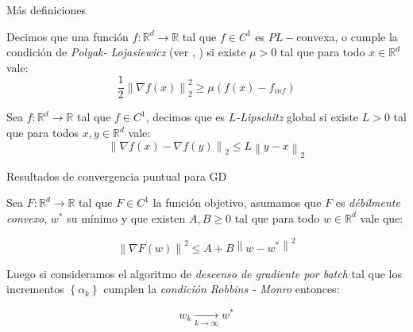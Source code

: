 \documentclass{beamer}
\newcommand{\R}{{\mathbb{R}}}
\newcommand{\norm}[1]{\left\lVert#1\right\rVert}
\newcommand{\sett}[1]{\left\lbrace#1\right\rbrace}
\newcommand{\underlimitinf}[1]{\xrightarrow[#1 \rightarrow \infty]{}}
\begin{document}
\begin{frame}{M\'as definiciones}

\begin{definition}
	Decimos que una funci\'on $f:\R^d \rightarrow \R$ tal que $f \in C^1$ es $PL-$convexa, o cumple la condici\'on de \textit{Polyak- Lojasiewicz} (ver \cite{polyak:1963}, \cite{lojasiewicz:1963}) si existe $\mu >0$ tal que para todo $x \in \R^d$ vale:
	\begin{equation*}
	\frac{1}{2} \norm{\nabla f(x)}^2_2 \geq \mu \left(f(x) - f_{inf}\right)
	\end{equation*}
\end{definition}

\begin{definition}
	Sea $f:\R^d \rightarrow \R$ tal que $f \in C^1$, decimos que es $L$\textit{-Lipschitz} global si existe $L > 0$ tal que para todos $x,y \in \R^d$ vale:
	\begin{equation*}
	\norm{\nabla f(x) - \nabla f (y)}_2 \leq  L\norm{y-x}_2
	\end{equation*}
\end{definition}

\end{frame}

\begin{frame}{Resultados de convergencia puntual para GD}

\begin{theorem}
	Sea $F: \R^d \rightarrow \R$ tal que $F \in C^1$ la funci\'on objetivo, asumamos que $F$ es \textit{d\'ebilmente convexo}, $w^*$ su m\'inimo y que existen $A,B \geq 0$ tal que para todo $w \in \R^d$ vale que:
	
	\begin{equation*}
	\norm{\nabla F(w)}^2 \leq A + B \norm{w - w^*}^2
	\end{equation*}
	
	Luego si consideramos el algoritmo de \textit{descenso de gradiente por batch} tal que los incrementos $\sett{\alpha_k}$  cumplen la \textit{condici\'on Robbins - Monro} entonces:
	
	\begin{equation*}
	w_k \underlimitinf{k} w^*
	\end{equation*}
	
\end{theorem}

\end{frame}
\end{document}
